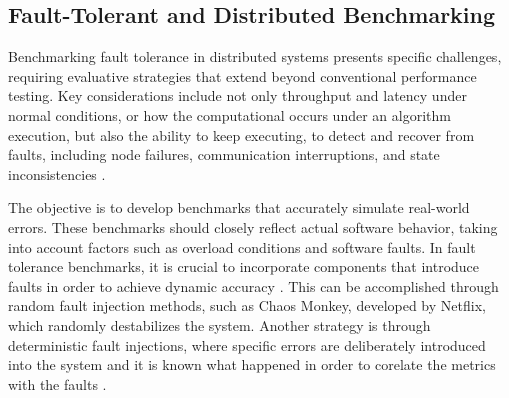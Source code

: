 \subsection{Fault-Tolerant and Distributed Benchmarking}

Benchmarking fault tolerance in distributed systems presents specific challenges, requiring evaluative strategies that extend beyond conventional performance testing. Key considerations include not only throughput and latency under normal conditions, or how the computational occurs under an algorithm execution, but also the ability to keep executing, to detect and recover from faults, including node failures, communication interruptions, and state inconsistencies \cite{Randtoul2022, Blessing2019, Almeida2013}.

The objective is to develop benchmarks that accurately simulate real-world errors. These benchmarks should closely reflect actual software behavior, taking into account factors such as overload conditions and software faults. In fault tolerance benchmarks, it is crucial to incorporate components that introduce faults in order to achieve dynamic accuracy \cite{Almeida2013}. This can be accomplished through random fault injection methods, such as Chaos Monkey, developed by Netflix, which randomly destabilizes the system. Another strategy is through deterministic fault injections, where specific errors are deliberately introduced into the system and it is known what happened in order to corelate the metrics with the faults \cite{Randtoul2022}.

